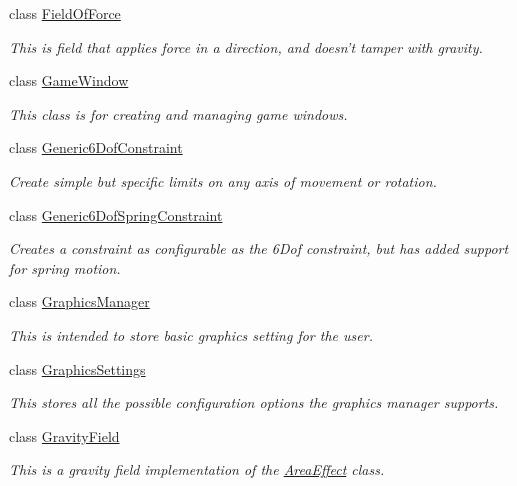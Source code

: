 \begin{DoxyCompactItemize}
class \hyperlink{classMezzanine_1_1FieldOfForce}{FieldOfForce}
\begin{DoxyCompactList}\small\item\em This is field that applies force in a direction, and doesn't tamper with gravity. \item\end{DoxyCompactList}\item 
class \hyperlink{classMezzanine_1_1GameWindow}{GameWindow}
\begin{DoxyCompactList}\small\item\em This class is for creating and managing game windows. \item\end{DoxyCompactList}\item 
class \hyperlink{classMezzanine_1_1Generic6DofConstraint}{Generic6DofConstraint}
\begin{DoxyCompactList}\small\item\em Create simple but specific limits on any axis of movement or rotation. \item\end{DoxyCompactList}\item 
class \hyperlink{classMezzanine_1_1Generic6DofSpringConstraint}{Generic6DofSpringConstraint}
\begin{DoxyCompactList}\small\item\em Creates a constraint as configurable as the 6Dof constraint, but has added support for spring motion. \item\end{DoxyCompactList}\item 
class \hyperlink{classMezzanine_1_1GraphicsManager}{GraphicsManager}
\begin{DoxyCompactList}\small\item\em This is intended to store basic graphics setting for the user. \item\end{DoxyCompactList}\item 
class \hyperlink{structMezzanine_1_1GraphicsSettings}{GraphicsSettings}
\begin{DoxyCompactList}\small\item\em This stores all the possible configuration options the graphics manager supports. \item\end{DoxyCompactList}\item 
class \hyperlink{classMezzanine_1_1GravityField}{GravityField}
\begin{DoxyCompactList}\small\item\em This is a gravity field implementation of the \hyperlink{classMezzanine_1_1AreaEffect}{AreaEffect} class. \item\end{DoxyCompactList}\item 

\end{DoxyCompactItemize}
